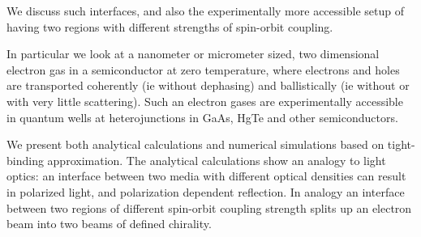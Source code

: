 We discuss such interfaces, and also the experimentally more accessible setup
of having two regions with different strengths of spin-orbit coupling.

In particular we look at a nanometer or micrometer sized, two dimensional
electron gas in a semiconductor at zero temperature, where electrons and holes
are transported coherently (ie without dephasing) and ballistically (ie
without or with very little scattering). Such an electron gases are
experimentally accessible in quantum wells at heterojunctions in GaAs,
HgTe and other semiconductors.

We present both analytical calculations and numerical simulations based on
tight-binding approximation. The analytical calculations show an analogy to
light optics:  an interface between two media with different optical densities
can result in polarized light, and polarization dependent reflection. In
analogy an interface between two regions of different spin-orbit coupling
strength splits up an electron beam into two beams of defined chirality.

